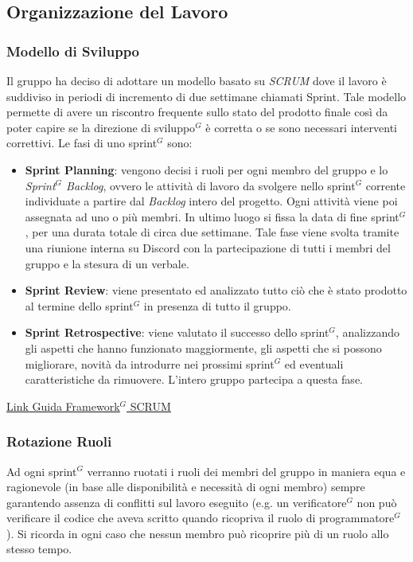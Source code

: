 \documentclass[a4paper,10pt]{article}
\begin{document}
\subsection{Organizzazione del Lavoro}
\subsubsection{Modello di Sviluppo}
Il gruppo ha deciso di adottare un modello basato su \textit{SCRUM} dove il lavoro è suddiviso in periodi di incremento 
di due settimane chiamati Sprint. Tale modello permette di avere un riscontro frequente sullo stato del prodotto finale
così da poter capire se la direzione di sviluppo$^G$ è corretta o se sono necessari interventi correttivi. 
Le fasi di uno sprint$^G$ sono:
\begin{itemize}
  \item \textbf{Sprint Planning}: vengono decisi i ruoli per ogni membro del gruppo e lo \textit{Sprint$^G$ Backlog}, ovvero le attività
  di lavoro da svolgere nello sprint$^G$ corrente individuate a partire dal \textit{Backlog} intero del progetto.
  Ogni attività viene poi assegnata ad uno o più membri. In ultimo luogo si fissa la data di fine sprint$^G$, per una
  durata totale di circa due settimane.
  Tale fase viene svolta tramite una riunione interna su Discord con la partecipazione di tutti i membri del gruppo e la
  stesura di un verbale.
  \item \textbf{Sprint Review}: viene presentato ed analizzato tutto ciò che è stato prodotto al termine dello sprint$^G$ in presenza di
  tutto il gruppo.
  \item \textbf{Sprint Retrospective}: viene valutato il successo dello sprint$^G$, analizzando gli aspetti che hanno funzionato maggiormente,
  gli aspetti che si possono migliorare, novità da introdurre nei prossimi sprint$^G$ ed eventuali caratteristiche da rimuovere.
  L'intero gruppo partecipa a questa fase.
\end{itemize}
\href{https://scrumguides.org/scrum-guide.html}{\underline{Link Guida Framework$^G$ SCRUM}}
\subsubsection{Rotazione Ruoli}
Ad ogni sprint$^G$ verranno ruotati i ruoli dei membri del gruppo in maniera equa e ragionevole (in base alle disponibilità e necessità
di ogni membro) sempre garantendo assenza di conflitti sul lavoro eseguito (e.g. un verificatore$^G$ non può verificare il codice che 
aveva scritto quando ricopriva il ruolo di programmatore$^G$). Si ricorda in ogni caso che nessun membro può ricoprire più di un ruolo
allo stesso tempo.
\end{document}

